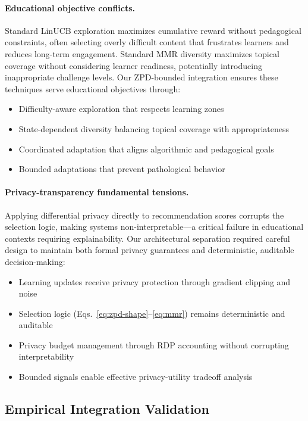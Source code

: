 \paragraph{Educational objective conflicts.} Standard LinUCB exploration maximizes cumulative reward without pedagogical constraints, often selecting overly difficult content that frustrates learners and reduces long-term engagement. Standard MMR diversity maximizes topical coverage without considering learner readiness, potentially introducing inappropriate challenge levels. Our ZPD-bounded integration ensures these techniques serve educational objectives through:
\begin{itemize}
  \item Difficulty-aware exploration that respects learning zones
  \item State-dependent diversity balancing topical coverage with appropriateness
  \item Coordinated adaptation that aligns algorithmic and pedagogical goals
  \item Bounded adaptations that prevent pathological behavior
\end{itemize}

\paragraph{Privacy-transparency fundamental tensions.} Applying differential privacy directly to recommendation scores corrupts the selection logic, making systems non-interpretable—a critical failure in educational contexts requiring explainability. Our architectural separation required careful design to maintain both formal privacy guarantees and deterministic, auditable decision-making:
\begin{itemize}
  \item Learning updates receive privacy protection through gradient clipping and noise
  \item Selection logic (Eqs.~\eqref{eq:zpd-shape}--\eqref{eq:mmr}) remains deterministic and auditable
  \item Privacy budget management through RDP accounting without corrupting interpretability
  \item Bounded signals enable effective privacy-utility tradeoff analysis
\end{itemize}

\subsection{Empirical Integration Validation}
\label{app:integration-validation}

